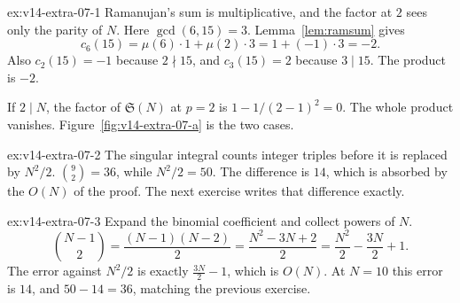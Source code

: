 \begin{solution}{ex:v14-extra-07-1}
\idea Ramanujan's sum is multiplicative, and the factor at $2$ sees only the parity of $N$.
\writeup Here $\gcd(6,15)=3$. Lemma~\ref{lem:ramsum} gives
\[
c_6(15)=\mu(6)\cdot1+\mu(2)\cdot3=1+(-1)\cdot3=-2.
\]
Also $c_2(15)=-1$ because $2\nmid15$, and $c_3(15)=2$ because $3\mid15$. The product is $-2$.

If $2\mid N$, the factor of $\mathfrak S(N)$ at $p=2$ is $1-1/(2-1)^2=0$. The whole product vanishes. Figure~\ref{fig:v14-extra-07-a} is the two cases.
\end{solution}

\begin{solution}{ex:v14-extra-07-2}
\idea The singular integral counts integer triples before it is replaced by $N^2/2$.
\writeup $\binom{9}2=36$, while $N^2/2=50$. The difference is $14$, which is absorbed by the $O(N)$ of the proof. The next exercise writes that difference exactly.
\end{solution}

\begin{solution}{ex:v14-extra-07-3}
\idea Expand the binomial coefficient and collect powers of $N$.
\writeup 
\[
\binom{N-1}2=\frac{(N-1)(N-2)}2=\frac{N^2-3N+2}2=\frac{N^2}2-\frac{3N}2+1.
\]
The error against $N^2/2$ is exactly $\frac{3N}2-1$, which is $O(N)$. At $N=10$ this error is $14$, and $50-14=36$, matching the previous exercise.
\end{solution}


